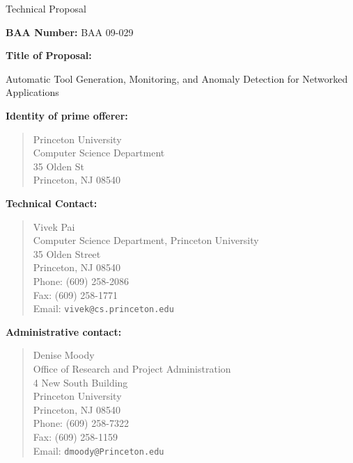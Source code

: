 \documentclass[12pt]{article}
\begin{document}
\begin{center}
{\Large Technical Proposal}
\end{center}

{\bf BAA Number:} BAA 09-029

\vspace{.5in}

{\bf Title of Proposal:}  

Automatic Tool Generation, Monitoring, and Anomaly Detection for Networked Applications

\vspace{.5in}

{\bf Identity of prime offerer:}
\begin{quote}
Princeton University \\
Computer Science Department \\
35 Olden St \\
Princeton, NJ 08540
\end{quote}

\vspace{.3in}

{\bf Technical Contact:}  
\begin{quote}
Vivek Pai \\
Computer Science Department, Princeton University \\
35 Olden Street \\
Princeton, NJ 08540 \\
Phone: (609) 258-2086 \\
Fax: (609) 258-1771 \\
Email: {\tt vivek@cs.princeton.edu} \\
\end{quote}

\vspace{.3in}

{\bf Administrative contact:}
\begin{quote}
Denise Moody\\
Office of Research and Project Administration \\
4 New South Building \\
Princeton University \\
Princeton, NJ 08540 \\
Phone:  (609) 258-7322\\
Fax: (609) 258-1159\\
Email: {\tt dmoody@Princeton.edu}\\
\end{quote}
\end{document}
